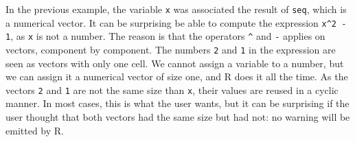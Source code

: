 \documentclass{article}
\newcommand\R{R}
\begin{document}
In the previous example,
the variable \texttt{x} was associated the result
of \texttt{seq}, which is a numerical vector.
It can be surprising be able to compute
the expression \texttt{x^2 - 1},
as \texttt{x} is not a number.
The reason is that the operators \texttt{^} and \texttt{-}
applies on vectors, component by component.
The numbers \texttt{2} and \texttt{1}
in the expression are seen as vectors with only one cell.
We cannot assign a variable to a number,
but we can assign it a numerical vector of size one,
and \R{} does it all the time.
As the vectors \texttt{2} and \texttt{1}
are not the same size than \texttt{x},
their values are reused in a cyclic manner.
In most cases, this is what the user wants,
but it can be surprising if the user thought that both
vectors had the same size but had not:
no warning will be emitted by \R{}.
\end{document}
